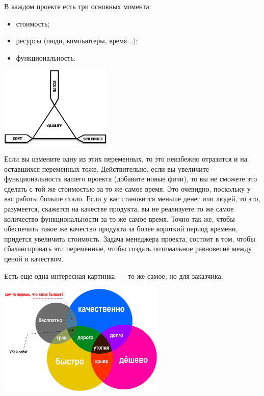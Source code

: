 \documentclass{../../text-style}
\begin{document}
В каждом проекте есть три основных момента:

\begin{itemize}
    \item стоимость;
    \item ресурсы (люди, компьютеры, время...);
    \item функциональность.
\end{itemize}

\begin{center}
    \includegraphics[width=0.4\textwidth]{balanceTriangle.png}
\end{center}

Если вы измените одну из этих переменных, то это неизбежно отразится и на оставшихся переменных тоже. Действительно, если вы увеличите функциональность вашего проекта (добавите новые фичи), то вы не сможете это сделать с той же стоимостью за то же самое время. Это очевидно, поскольку у вас работы больше стало. Если у вас становится меньше денег или людей, то это, разумеется, скажется на качестве продукта, вы не реализуете то же самое количество функциональности за то же самое время. Точно так же, чтобы обеспечить такое же качество продукта за более короткий период времени, придется увеличить стоимость. Задача менеджера проекта, состоит в том, чтобы сбалансировать эти переменные, чтобы создать оптимальное равновесие между ценой и качеством.

Есть еще одна интересная картинка~--- то же самое, но для заказчика:

\begin{center}
    \includegraphics[width=0.6\textwidth]{balanceTriangleExplained.png}
\end{center}
\end{document}
